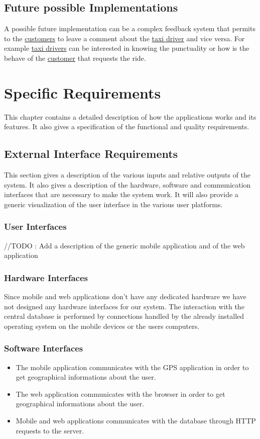\documentclass{report}
\begin{document}
	\section{Future possible Implementations}
	A possible future implementation can be a complex feedback system that permits to the \hyperref[sec:customer]{customers} to leave a comment about the \hyperref[sec:tdriver]{taxi driver} and vice versa.
	For example \hyperref[sec:tdriver]{taxi drivers} can be interested in knowing the punctuality or how is the behave of the \hyperref[sec:customer]{customer} that requests the ride.

\chapter{Specific Requirements}
This chapter contains a detailed description of how the applications works and its features. It also gives a specification of the functional and quality requirements.

	\section{External Interface Requirements}
	This section gives a description of the various inputs and relative outputs of the system. It also gives a description of the hardware, software and communication interfaces that are necessary to make the system work. It will also provide a generic visualization of the user interface in the various user platforms.

		\subsection{User Interfaces}
		//TODO : Add a description of the generic mobile application and of the web application

		\subsection{Hardware Interfaces}
		Since mobile and web applications don't have any dedicated hardware we have not designed any hardware interfaces for our system.
		The interaction with the central database is performed by connections handled by the already installed operating system on the mobile devices or the users computers.

		\subsection{Software Interfaces}
			\begin{itemize}
				\item The mobile application communicates with the GPS application in order to get geographical informations about the user.
				
				\item The web application communicates with the browser in order to get geographical informations about the user.
				
				\item Mobile and web applications communicates with the database through HTTP requests to the server.
			\end{itemize}
\end{document}
